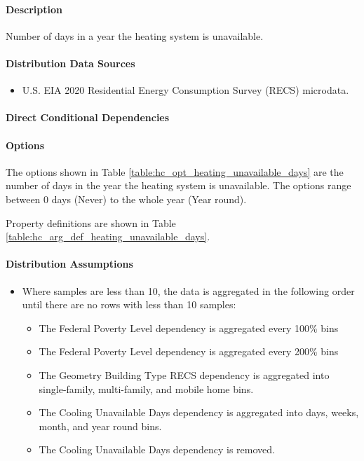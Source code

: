 \paragraph{Description}
% 
Number of days in a year the heating system is unavailable.

\paragraph{Distribution Data Sources}
% 
\begin{itemize}
	\item U.S. EIA 2020 Residential Energy Consumption Survey (RECS) microdata.
\end{itemize}

\paragraph{Direct Conditional Dependencies}


\paragraph{Options}
The options shown in Table \ref{table:hc_opt_heating_unavailable_days} are the number of days in the year the heating system is unavailable. The options range between 0 days (Never) to the whole year (Year round).



Property definitions are shown in Table \ref{table:hc_arg_def_heating_unavailable_days}.



\paragraph{Distribution Assumptions}
% 
\begin{itemize}
	\item Where samples are less than 10, the data is aggregated in the following order until there are no rows with less than 10 samples:
	\begin{itemize}
		\item The Federal Poverty Level dependency is aggregated every 100\% bins
		\item The Federal Poverty Level dependency is aggregated every 200\% bins
		\item The Geometry Building Type RECS dependency is aggregated into single-family, multi-family, and mobile home bins.
		\item The Cooling Unavailable Days dependency is aggregated into days, weeks, month, and year round bins.
		\item The Cooling Unavailable Days dependency is removed.
	\end{itemize}
\end{itemize}
